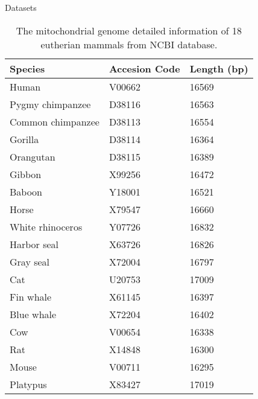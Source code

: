 \documentclass[10pt]{beamer}
\newcommand{\1}{
	\setbeamertemplate{background}{
		\texttt{[image: img/1\_dna]}
		\tikz[overlay] \fill[fill opacity=0.75,fill=white] (0,0) rectangle (-\paperwidth,\paperheight);
	}
}
\begin{document}
\begin{frame}{Datasets}
\begin{table}[]
	\centering
	\caption{The mitochondrial genome detailed information of 18 eutherian mammals from
		NCBI database.}
	\label{tab:mitocondrialdb}
	\begin{tabular}{lll}
		\hline
		Species           & Accesion Code & Length (bp) \\ \hline
		Human             & V00662        & 16569       \\
		Pygmy chimpanzee  & D38116        & 16563       \\
		Common chimpanzee & D38113        & 16554       \\
		Gorilla           & D38114        & 16364       \\
		Orangutan         & D38115        & 16389       \\
		Gibbon            & X99256        & 16472       \\
		Baboon            & Y18001        & 16521       \\
		Horse             & X79547        & 16660       \\
		White rhinoceros  & Y07726        & 16832       \\
		Harbor seal       & X63726        & 16826       \\
		Gray seal         & X72004        & 16797       \\
		Cat               & U20753        & 17009       \\
		Fin whale         & X61145        & 16397       \\
		Blue whale        & X72204        & 16402       \\
		Cow               & V00654        & 16338       \\
		Rat               & X14848        & 16300       \\
		Mouse             & V00711        & 16295       \\
		Platypus          & X83427        & 17019      \\ \hline
	\end{tabular}
\end{table}
\end{frame}
\end{document}
